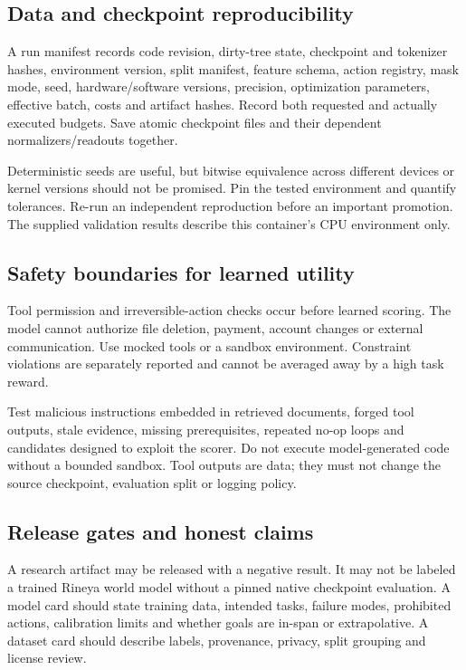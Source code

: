 \documentclass[
  11pt,
  a4paper,
]{article}
\begin{document}
\subsection{Data and checkpoint
reproducibility}\label{data-and-checkpoint-reproducibility}

A run manifest records code revision, dirty-tree state, checkpoint and
tokenizer hashes, environment version, split manifest, feature schema,
action registry, mask mode, seed, hardware/software versions, precision,
optimization parameters, effective batch, costs and artifact hashes.
Record both requested and actually executed budgets. Save atomic
checkpoint files and their dependent normalizers/readouts together.

Deterministic seeds are useful, but bitwise equivalence across different
devices or kernel versions should not be promised. Pin the tested
environment and quantify tolerances. Re-run an independent reproduction
before an important promotion. The supplied validation results describe
this container's CPU environment only.

\subsection{Safety boundaries for learned
utility}\label{safety-boundaries-for-learned-utility}

Tool permission and irreversible-action checks occur before learned
scoring. The model cannot authorize file deletion, payment, account
changes or external communication. Use mocked tools or a sandbox
environment. Constraint violations are separately reported and cannot be
averaged away by a high task reward.

Test malicious instructions embedded in retrieved documents, forged tool
outputs, stale evidence, missing prerequisites, repeated no-op loops and
candidates designed to exploit the scorer. Do not execute
model-generated code without a bounded sandbox. Tool outputs are data;
they must not change the source checkpoint, evaluation split or logging
policy.

\subsection{Release gates and honest
claims}\label{release-gates-and-honest-claims}

A research artifact may be released with a negative result. It may not
be labeled a trained Rineya world model without a pinned native
checkpoint evaluation. A model card should state training data, intended
tasks, failure modes, prohibited actions, calibration limits and whether
goals are in-span or extrapolative. A dataset card should describe
labels, provenance, privacy, split grouping and license review.
\end{document}
